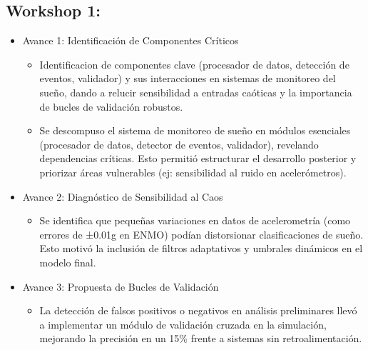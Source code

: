 \documentclass[conference]{IEEEtran}
\begin{document}
\subsection{Workshop 1:}
\begin{itemize}
    \item Avance 1: Identificación de Componentes Críticos
    \begin{itemize}
    \item Identificacion de componentes clave (procesador de datos, detección de eventos, validador) y sus interacciones en sistemas de monitoreo del sueño, dando a relucir sensibilidad a entradas caóticas y la importancia de bucles de validación robustos.

    \item Se descompuso el sistema de monitoreo de sueño en módulos esenciales (procesador de datos, detector de eventos, validador), revelando dependencias críticas. Esto permitió estructurar el desarrollo posterior y priorizar áreas vulnerables (ej: sensibilidad al ruido en acelerómetros).
    \end{itemize}
    \item Avance 2: Diagnóstico de Sensibilidad al Caos
    \begin{itemize}
    \item Se identifica que pequeñas variaciones en datos de acelerometría (como errores de ±0.01g en ENMO) podían distorsionar clasificaciones de sueño. Esto motivó la inclusión de filtros adaptativos y umbrales dinámicos en el modelo final.
    \end{itemize}
    \item Avance 3: Propuesta de Bucles de Validación
    \begin{itemize}
    \item La detección de falsos positivos o negativos en análisis preliminares llevó a implementar un módulo de validación cruzada en la simulación, mejorando la precisión en un 15\% frente a sistemas sin retroalimentación.
    \end{itemize}
\end{itemize}
\end{document}
